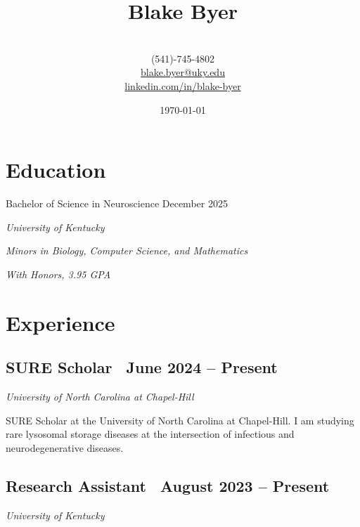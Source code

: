 \documentclass{article}
\begin{document}
\title{\Huge \textbf{Blake Byer} \vspace{-1.25em}}

\author{\\
    (541)-745-4802 \\
    \href{mailto:blake.byer@uky.edu}{blake.byer@uky.edu} \\
    \href{https://linkedin.com/in/blake-byer}{linkedin.com/in/blake-byer}
}
\date{\today}
\maketitle

\begin{flushleft}

\section*{Education}

{\large Bachelor of Science in Neuroscience \vspace{0.5em}}\hfill December 2025

\textit{University of Kentucky}

\textit{Minors in Biology, Computer Science, and Mathematics}

\textit{With Honors, 3.95 GPA}

\section*{Experience}

\subsection*{SURE Scholar {\hfill\normalsize\normalfont\ June 2024 -- Present}}
\textit{University of North Carolina at Chapel-Hill \vspace{0.5em}}

SURE Scholar at the University of North Carolina at Chapel-Hill. I am studying rare lysosomal storage diseases
at the intersection of infectious and neurodegenerative diseases.

\subsection*{Research Assistant {\hfill\normalsize\normalfont\ August 2023 -- Present}}
\textit{University of Kentucky \vspace{0.5em}}


\end{flushleft}
\end{document}
